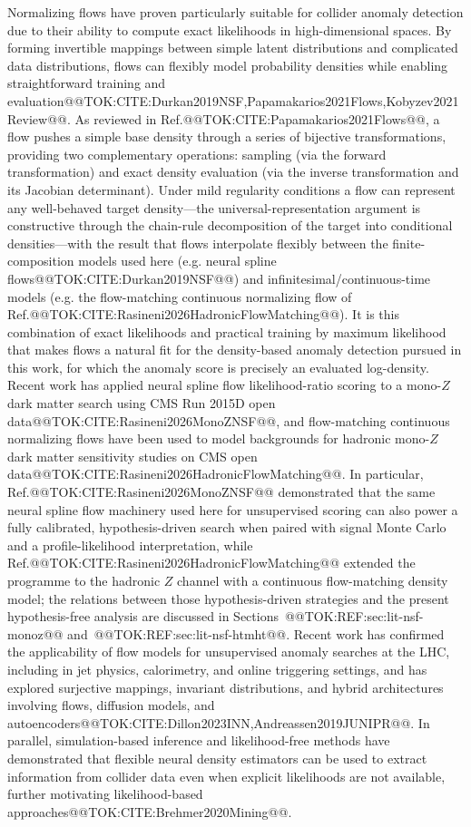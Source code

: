 \documentclass[11pt]{article}
\begin{document}
Normalizing flows have proven particularly suitable for collider anomaly detection due to their ability to compute exact likelihoods in high-dimensional spaces. By forming invertible mappings between simple latent distributions and complicated data distributions, flows can flexibly model probability densities while enabling straightforward training and evaluation@@TOK:CITE:Durkan2019NSF,Papamakarios2021Flows,Kobyzev2021Review@@. As reviewed in Ref.@@TOK:CITE:Papamakarios2021Flows@@, a flow pushes a simple base density through a series of bijective transformations, providing two complementary operations: sampling (via the forward transformation) and exact density evaluation (via the inverse transformation and its Jacobian determinant). Under mild regularity conditions a flow can represent any well-behaved target density---the universal-representation argument is constructive through the chain-rule decomposition of the target into conditional densities---with the result that flows interpolate flexibly between the finite-composition models used here (e.g. neural spline flows@@TOK:CITE:Durkan2019NSF@@) and infinitesimal/continuous-time models (e.g. the flow-matching continuous normalizing flow of Ref.@@TOK:CITE:Rasineni2026HadronicFlowMatching@@). It is this combination of exact likelihoods and practical training by maximum likelihood that makes flows a natural fit for the density-based anomaly detection pursued in this work, for which the anomaly score is precisely an evaluated log-density. Recent work has applied neural spline flow likelihood-ratio scoring to a mono-$Z$ dark matter search using CMS Run 2015D open data@@TOK:CITE:Rasineni2026MonoZNSF@@, and flow-matching continuous normalizing flows have been used to model backgrounds for hadronic mono-$Z$ dark matter sensitivity studies on CMS open data@@TOK:CITE:Rasineni2026HadronicFlowMatching@@. In particular, Ref.@@TOK:CITE:Rasineni2026MonoZNSF@@ demonstrated that the same neural spline flow machinery used here for unsupervised scoring can also power a fully calibrated, hypothesis-driven search when paired with signal Monte Carlo and a profile-likelihood interpretation, while Ref.@@TOK:CITE:Rasineni2026HadronicFlowMatching@@ extended the programme to the hadronic $Z$ channel with a continuous flow-matching density model; the relations between those hypothesis-driven strategies and the present hypothesis-free analysis are discussed in Sections~@@TOK:REF:sec:lit-nsf-monoz@@ and~@@TOK:REF:sec:lit-nsf-htmht@@. Recent work has confirmed the applicability of flow models for unsupervised anomaly searches at the LHC, including in jet physics, calorimetry, and online triggering settings, and has explored surjective mappings, invariant distributions, and hybrid architectures involving flows, diffusion models, and autoencoders@@TOK:CITE:Dillon2023INN,Andreassen2019JUNIPR@@. In parallel, simulation-based inference and likelihood-free methods have demonstrated that flexible neural density estimators can be used to extract information from collider data even when explicit likelihoods are not available, further motivating likelihood-based approaches@@TOK:CITE:Brehmer2020Mining@@.
\end{document}
